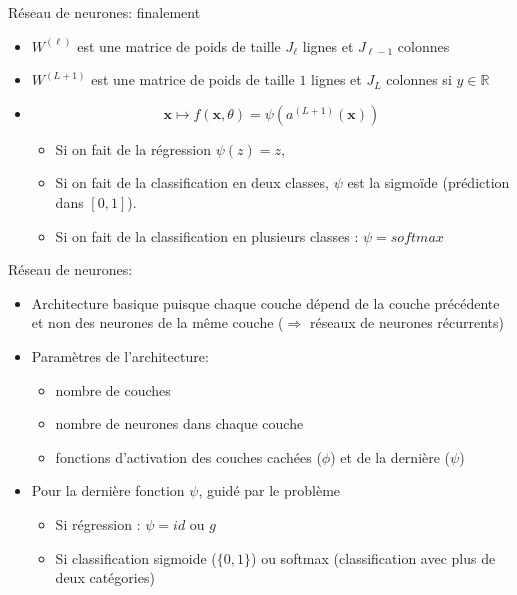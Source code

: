 \documentclass[ignorenonframetext,]{beamer}
\providecommand{\tightlist}{%
  \setlength{\itemsep}{0pt}\setlength{\parskip}{0pt}}
\begin{document}
\begin{frame}{Réseau de neurones: finalement}

\begin{itemize}
\tightlist
\item
  \(W^{(\ell)}\) est une matrice de poids de taille \(J_{\ell}\) lignes
  et \(J_{\ell-1}\) colonnes
\item
  \(W^{(L+1)}\) est une matrice de poids de taille \(1\) lignes et
  \(J_{L}\) colonnes si \(y \in \mathbb{R}\)
\item
  \[\mathbf{x} \mapsto f(\mathbf{x},\theta) = \psi(a^{(L+1)}(\mathbf{x}))\]

  \begin{itemize}
  \tightlist
  \item
    Si on fait de la régression \(\psi(z) = z\),
  \item
    Si on fait de la classification en deux classes, \(\psi\) est la
    sigmoïde (prédiction dans \([0,1]\)).
  \item
    Si on fait de la classification en plusieurs classes :
    \(\psi = softmax\)
  \end{itemize}
\end{itemize}

\end{frame}

\begin{frame}{Réseau de neurones:}

\begin{itemize}
\item
  Architecture basique puisque chaque couche dépend de la couche
  précédente et non des neurones de la même couche (\(\Rightarrow\)
  réseaux de neurones récurrents)
\item
  Paramètres de l'architecture:

  \begin{itemize}
  \tightlist
  \item
    nombre de couches
  \item
    nombre de neurones dans chaque couche
  \item
    fonctions d'activation des couches cachées (\(\phi\)) et de la
    dernière (\(\psi\))
  \end{itemize}
\item
  Pour la dernière fonction \(\psi\), guidé par le problème

  \begin{itemize}
  \tightlist
  \item
    Si régression : \(\psi = id\) ou \(g\)
  \item
    Si classification sigmoide (\(\{0,1\}\)) ou softmax (classification
    avec plus de deux catégories)
  \end{itemize}
\end{itemize}

\end{frame}
\end{document}
